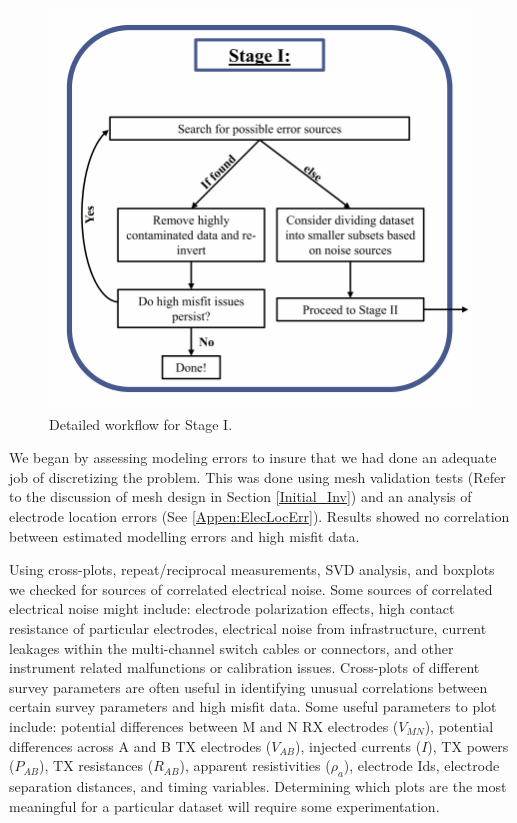 \documentclass[final,authoryear,5p,times,twocolumn]{elsarticle}
\begin{document}
\begin{figure} [!ht]
\begin{center}
   \includegraphics[trim=0cm 0cm 0cm 0cm, clip=true,width=0.75\linewidth]{./Figures/Fig5.pdf}
\end{center}
\caption{Detailed workflow for Stage I.}
\label{fig:DataQC_workflow_StageI}
\end{figure}

We began by assessing modeling errors to insure that we had done an adequate job of discretizing the problem. This was done using mesh validation tests (Refer to the discussion of mesh design in Section \ref{Initial_Inv}) and an analysis of electrode location errors (See \ref{Appen:ElecLocErr}). Results showed no correlation between estimated modelling errors and high misfit data.

Using cross-plots, repeat/reciprocal measurements, SVD analysis, and boxplots we checked for sources of correlated electrical noise. Some sources of correlated electrical noise might include: electrode polarization effects, high contact resistance of particular electrodes, electrical noise from infrastructure, current leakages within the multi-channel switch cables or connectors, and other instrument related malfunctions or calibration issues. Cross-plots of different survey parameters are often useful in identifying unusual correlations between certain survey parameters and high misfit data. Some useful parameters to plot include: potential differences between M and N RX electrodes ($V_{MN}$), potential differences across A and B TX electrodes ($V_{AB}$), injected currents ($I$), TX powers ($P_{AB}$), TX resistances ($R_{AB}$), apparent resistivities ($\rho_a$), electrode Ids, electrode separation distances, and timing variables. Determining which plots are the most meaningful for a particular dataset will require some experimentation.
\end{document}
